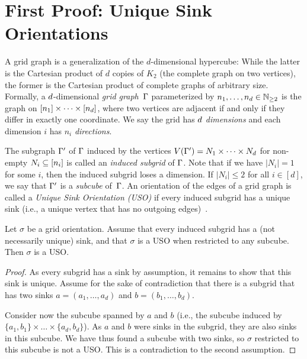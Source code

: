 \documentclass[a4paper,UKenglish,cleveref, autoref, thm-restate, nolineno]{socg-lipics-v2021}
\newcommand{\abs}[1]{\left\lvert #1 \right\rvert\xspace}
\newcommand{\Naturals}{\mathbb{N}\xspace}
\newcommand{\f}[1]{\relax\ifmmode#1\else{$#1$}\fi}
\newcommand{\dimensionA}{\f{d}\xspace}
\newcommand{\dimension}{\f{d}\xspace}
\newcommand{\Grid}{\f{\Gamma}\xspace}
\newcommand{\partitionLength}{\f{n}\xspace}
\begin{document}
\section{First Proof: Unique Sink Orientations}
\label{sec:uso_proof}

A grid graph is a generalization of the $d$-dimensional hypercube: 
While the latter is the Cartesian product of $d$ copies of $K_2$ (the complete graph on two vertices), the former is the Cartesian product of complete graphs of arbitrary size.
Formally, a $\dimensionA$-dimensional \emph{grid graph}~$\Grid$ parameterized by $\partitionLength_1, \dots, \partitionLength_\dimensionA \in \Naturals_{\geq 2}$ is the graph on $[\partitionLength_1] \times \dots \times [\partitionLength_\dimensionA]$, where two vertices are adjacent if and only if they differ in exactly one coordinate.
We say the grid has $\dimensionA$ \emph{dimensions} and each dimension $i$ has $n_i$ \emph{directions}.

The subgraph $\Grid'$ of $\Grid$ induced by the vertices $V(\Grid') = N_1 \times \dots \times N_\dimension$ for non-empty $N_i \subseteq [\partitionLength_i]$ 
is called an \emph{induced subgrid} of $\Grid$.
Note that if we have $\abs{N_i}=1$ for some $i$, then the induced subgrid loses a dimension.
If $\abs{N_i} \leq 2$ for all $i \in [d]$, we say that $\Grid'$ is a \emph{subcube} of~$\Grid$.
An orientation of the edges of a grid graph is called a \emph{Unique Sink Orientation (USO)} if every induced subgrid has a unique sink (i.e., a unique vertex that has no outgoing edges)~\cite{gaertner2008grids}.


\begin{lemma}\label{lem:GridUSO}
Let $\sigma$ be a grid orientation. Assume that every induced subgrid has a (not necessarily unique) sink, and that $\sigma$ is a USO when restricted to any subcube. Then $\sigma$ is a USO.
\end{lemma}

\begin{proof}
As every subgrid has a sink by assumption, it remains to show that this sink is unique. Assume for the sake of contradiction that there is a subgrid that has two sinks $a=(a_1,\ldots,a_d)$ and $b=(b_1,\ldots,b_d)$. 

Consider now the subcube spanned by $a$ and $b$ (i.e., the subcube induced by $\{a_1, b_1\} \times \dots \times \{a_d, b_d\}$). As $a$ and $b$ were sinks in the subgrid, they are also sinks in this subcube. We have thus found a subcube with two sinks, so $\sigma$ restricted to this subcube is not a USO. This is a contradiction to the second assumption.
\end{proof}
\end{document}
